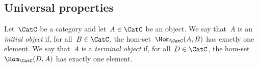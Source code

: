 \subsection{Universal properties}



\begin{ctdefinition}
Let~$\CatC$ be a category and let~$A \in \CatC$ be an object. We say that~$A$ is an \emph{initial object} if, for all~$B \in\CatC$, the hom-set~$\Hom_\CatC(A,B)$ has exactly one element. We say that~$A$ is a \emph{terminal object} if, for all~$D\in\CatC$, the hom-set~$\Hom_\CatC(D,A)$ has exactly one element.
\end{ctdefinition}
